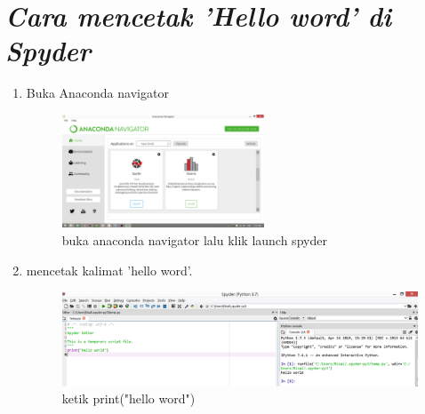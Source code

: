 \section*{\textit{ Cara mencetak 'Hello word' di Spyder}}
\begin{enumerate}

\item Buka Anaconda navigator
		\begin{figure}[h]
			\includegraphics[width=6cm]{figure/anaconda.png}
			\centering
			\caption{buka anaconda navigator lalu klik launch spyder}
			\end{figure}

\item mencetak kalimat 'hello word'.
			\begin{figure}[h]
			\includegraphics[scale=0.8]{figure/spyder.png}
			\centering
			\caption{ketik print("hello word")}
			\end{figure}
\end{enumerate}

